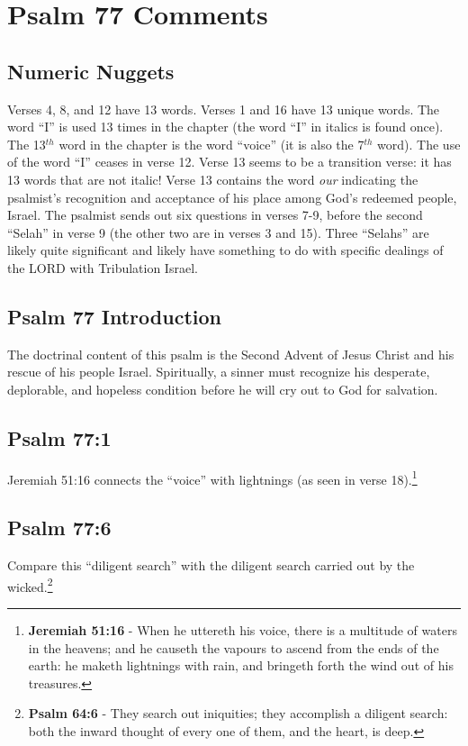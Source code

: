 \section{Psalm 77 Comments}

\subsection{Numeric Nuggets}
Verses 4, 8, and 12 have 13 words. Verses 1 and 16 have 13 unique words. The word ``I'' is used 13 times in the chapter (the word ``I'' in italics is found once). The 13$^{th}$ word in the chapter is the word ``voice'' (it is also the 7$^{th}$ word). The use of the word ``I'' ceases in verse 12. Verse 13 seems to be a transition verse: it has 13 words that are not italic! Verse 13 contains the word \emph{our} indicating the psalmist's recognition and acceptance of his place among God's redeemed people, Israel. The psalmist sends out six questions in verses 7-9, before the second ``Selah'' in verse 9 (the other two are in verses 3 and 15). Three ``Selahs'' are likely quite significant and likely have something to do with specific dealings of the LORD with Tribulation Israel.

\subsection{Psalm 77 Introduction}
The doctrinal content of this psalm is the Second Advent of Jesus Christ and his rescue of his people Israel. Spiritually, a sinner must recognize his desperate, deplorable, and hopeless condition before he will cry out to God for salvation. 

\subsection{Psalm 77:1}
Jeremiah 51:16 connects the ``voice'' with lightnings (as seen in verse 18).\footnote{\textbf{Jeremiah 51:16} - When he uttereth his voice, there is a multitude of waters in the heavens; and he causeth the vapours to ascend from the ends of the earth: he maketh lightnings with rain, and bringeth forth the wind out of his treasures.}

\subsection{Psalm 77:6}
Compare this ``diligent search'' with the diligent search carried out by the wicked.\footnote{\textbf{Psalm 64:6} - They search out iniquities; they accomplish a diligent search: both the inward thought of every one of them, and the heart, is deep. }

